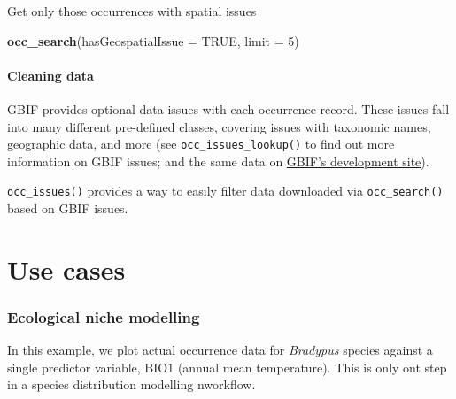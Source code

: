 \documentclass[author-year, review, 11pt]{components/elsarticle} %
\newenvironment{Shaded}{\begin{snugshade}}{\end{snugshade}}
\newcommand{\KeywordTok}[1]{\textcolor[rgb]{0.13,0.29,0.53}{\textbf{{#1}}}}
\newcommand{\DataTypeTok}[1]{\textcolor[rgb]{0.13,0.29,0.53}{{#1}}}
\newcommand{\DecValTok}[1]{\textcolor[rgb]{0.00,0.00,0.81}{{#1}}}
\newcommand{\StringTok}[1]{\textcolor[rgb]{0.31,0.60,0.02}{{#1}}}
\newcommand{\CommentTok}[1]{\textcolor[rgb]{0.56,0.35,0.01}{\textit{{#1}}}}
\newcommand{\OtherTok}[1]{\textcolor[rgb]{0.56,0.35,0.01}{{#1}}}
\newcommand{\NormalTok}[1]{{#1}}
\begin{document}
Get only those occurrences with spatial issues

\begin{Shaded}
\begin{Highlighting}[]
\KeywordTok{occ_search}\NormalTok{(}\DataTypeTok{hasGeospatialIssue =} \OtherTok{TRUE}\NormalTok{, }\DataTypeTok{limit =} \DecValTok{5}\NormalTok{)}
\end{Highlighting}
\end{Shaded}

\paragraph{Cleaning data}\label{cleaning-data}

GBIF provides optional data issues with each occurrence record. These
issues fall into many different pre-defined classes, covering issues
with taxonomic names, geographic data, and more (see
\texttt{occ\_issues\_lookup()} to find out more information on GBIF
issues; and the same data on
\href{http://gbif.github.io/gbif-api/apidocs/org/gbif/api/vocabulary/OccurrenceIssue.html}{GBIF's
development site}).

\texttt{occ\_issues()} provides a way to easily filter data downloaded
via \texttt{occ\_search()} based on GBIF issues.

\begin{Shaded}
\end{Shaded}

\section{Use cases}\label{use-cases}

\subsubsection{Ecological niche
modelling}\label{ecological-niche-modelling}

In this example, we plot actual occurrence data for \emph{Bradypus}
species against a single predictor variable, BIO1 (annual mean
temperature). This is only ont step in a species distribution modelling
nworkflow.
\end{document}
